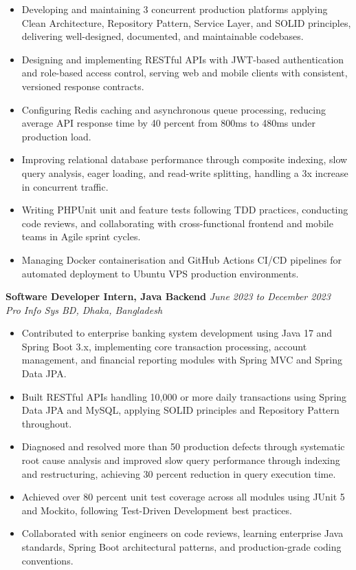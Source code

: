 \documentclass[a4paper,10.5pt]{article}
\begin{document}
\vspace{3pt}
\begin{itemize}[noitemsep, topsep=0pt, leftmargin=1.3em, label={$\bullet$}]
  \item Developing and maintaining 3 concurrent production platforms applying Clean Architecture, Repository Pattern, Service Layer, and SOLID principles, delivering well-designed, documented, and maintainable codebases.
  \item Designing and implementing RESTful APIs with JWT-based authentication and role-based access control, serving web and mobile clients with consistent, versioned response contracts.
  \item Configuring Redis caching and asynchronous queue processing, reducing average API response time by 40 percent from 800ms to 480ms under production load.
  \item Improving relational database performance through composite indexing, slow query analysis, eager loading, and read-write splitting, handling a 3x increase in concurrent traffic.
  \item Writing PHPUnit unit and feature tests following TDD practices, conducting code reviews, and collaborating with cross-functional frontend and mobile teams in Agile sprint cycles.
  \item Managing Docker containerisation and GitHub Actions CI/CD pipelines for automated deployment to Ubuntu VPS production environments.
\end{itemize}

\vspace{5pt}

\textbf{Software Developer Intern, Java Backend} \hfill \textit{June 2023 to December 2023}\\
\textit{Pro Info Sys BD, Dhaka, Bangladesh}

\vspace{3pt}
\begin{itemize}[noitemsep, topsep=0pt, leftmargin=1.3em, label={$\bullet$}]
  \item Contributed to enterprise banking system development using Java 17 and Spring Boot 3.x, implementing core transaction processing, account management, and financial reporting modules with Spring MVC and Spring Data JPA.
  \item Built RESTful APIs handling 10,000 or more daily transactions using Spring Data JPA and MySQL, applying SOLID principles and Repository Pattern throughout.
  \item Diagnosed and resolved more than 50 production defects through systematic root cause analysis and improved slow query performance through indexing and restructuring, achieving 30 percent reduction in query execution time.
  \item Achieved over 80 percent unit test coverage across all modules using JUnit 5 and Mockito, following Test-Driven Development best practices.
  \item Collaborated with senior engineers on code reviews, learning enterprise Java standards, Spring Boot architectural patterns, and production-grade coding conventions.
\end{itemize}
\end{document}
